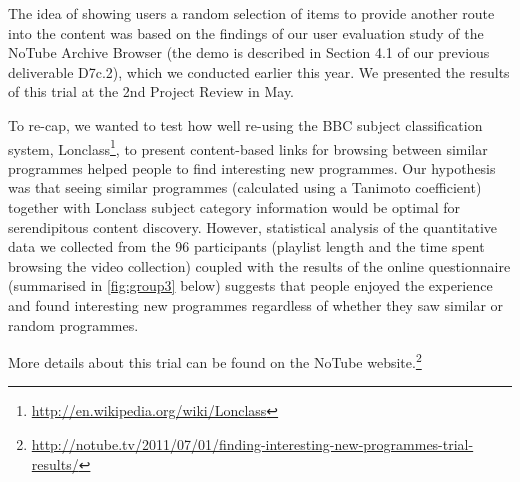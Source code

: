 \documentclass{notube}
\begin{document}
The idea of showing users a random selection of items to provide another route into the content was based on the findings of our user evaluation study of the NoTube Archive Browser (the demo is described in Section 4.1 of our previous deliverable D7c.2), which we conducted earlier this year. We presented the results of this trial at the 2nd Project Review in May. 

To re-cap, we wanted to test how well re-using the BBC subject classification system, Lonclass\footnote{\url{http://en.wikipedia.org/wiki/Lonclass}}, to present content-based links for browsing between similar programmes helped people to find interesting new programmes. Our hypothesis was that seeing similar programmes (calculated using a Tanimoto coefficient) together with Lonclass subject category information would be optimal for serendipitous content discovery. However, statistical analysis of the quantitative data we collected from the 96 participants (playlist length and the time spent browsing the video collection) coupled with the results of the online questionnaire (summarised in \ref{fig:group3} below) suggests that people enjoyed the experience and found interesting new programmes regardless of whether they saw similar or random programmes. 

More details about this trial can be found on the NoTube website.\footnote{\url{http://notube.tv/2011/07/01/finding-interesting-new-programmes-trial-results/}}
\end{document}

